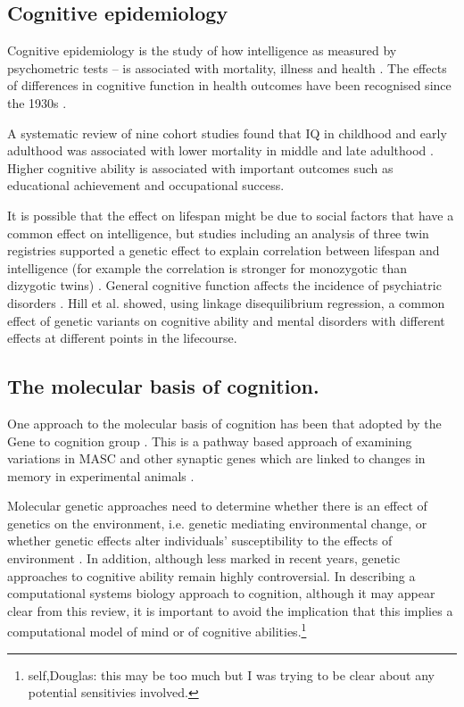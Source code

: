 \subsection{Cognitive epidemiology}

Cognitive epidemiology is the study of how intelligence as measured by psychometric tests – is associated with mortality, illness and health %
\cite{deary2010cognitive}. The effects of differences in cognitive function in health outcomes have been recognised since the 1930s \cite{deary2007cognitive}.%

A systematic review of nine cohort studies found that IQ in childhood and early adulthood was associated with lower mortality in middle and late adulthood %
\cite{batty2007premorbid}. Higher cognitive ability is associated with important outcomes such as educational achievement and occupational success.

It is possible that the effect on lifespan might be due to social factors that have a common effect on intelligence, but studies including an analysis of three twin registries supported a genetic effect to explain correlation between lifespan and intelligence (for example the correlation is stronger for monozygotic than dizygotic twins) %
\cite{arden2016association}. General cognitive function affects the incidence of psychiatric disorders %
\cite{wraw2015intelligence}. Hill et al. showed, using linkage disequilibrium regression, a common effect of genetic variants on cognitive ability and mental disorders with different effects at different points in the lifecourse\cite{hill2016age}.

\subsection{The molecular basis of cognition.}

One approach to the molecular basis of cognition has been that adopted by the Gene to cognition group %
\cite{croning2009g2cdb}. This is a pathway based approach of examining variations in MASC and other synaptic genes which are linked to changes in memory in experimental animals%
\cite{deary2009genetic}.

Molecular genetic approaches need to determine whether there is an effect of genetics on the environment, i.e. genetic mediating environmental change, or whether genetic effects alter individuals’ susceptibility to the effects of environment
\cite{deary2009genetic}. In addition, although less marked in recent years, genetic approaches to cognitive ability remain highly controversial. In describing a computational systems biology approach to cognition, although it may appear clear from this review, it is important to avoid the implication that this implies a computational model of mind or of cognitive abilities.\footnote{self,Douglas: this may be too much but I was trying to be clear about any potential sensitivies involved.}

